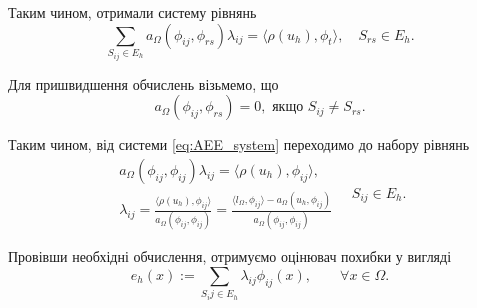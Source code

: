 Таким чином, отримали систему рівнянь
%
\begin{equation}\label{eq:AEE_system}
	\sum \limits_{S_{ij} \in E_h} a_\Omega(\phi_{ij}, \phi_{rs}) \lambda_{ij} = \langle \rho(u_h), \phi_t \rangle, \quad S_{rs} \in E_h.
\end{equation}

Для пришвидшення обчислень візьмемо, що
%
\begin{equation}
	a_\Omega(\phi_{ij}, \phi_{rs}) = 0, \text{ якщо } S_{ij} \ne S_{rs}.
\end{equation}

Таким чином, від системи \eqref{eq:AEE_system} переходимо до набору рівнянь
%
\begin{equation}
	\begin{split}
		a_\Omega(\phi_{ij}, \phi_{ij}) \lambda_{ij} = \langle \rho(u_h), \phi_{ij} \rangle ,\\
		\lambda_{ij} = \frac{\langle \rho(u_h), \phi_{ij} \rangle}{a_\Omega(\phi_{ij}, \phi_{ij})}
			= \frac{\langle l_\Omega, \phi_{ij}\rangle - a_\Omega(u_h, \phi_{ij})}{a_\Omega(\phi_{ij}, \phi_{ij})}
	\end{split}
	\quad S_{ij} \in E_h.
\end{equation}

Провівши необхідні обчислення, отримуємо оцінювач похибки у вигляді
\begin{equation}\label{eq:AEE_final}
	e_h(x) := \sum \limits_{S_ij \in E_h} \lambda_{ij} \phi_{ij}(x), \qquad \forall x \in \Omega.
\end{equation}
